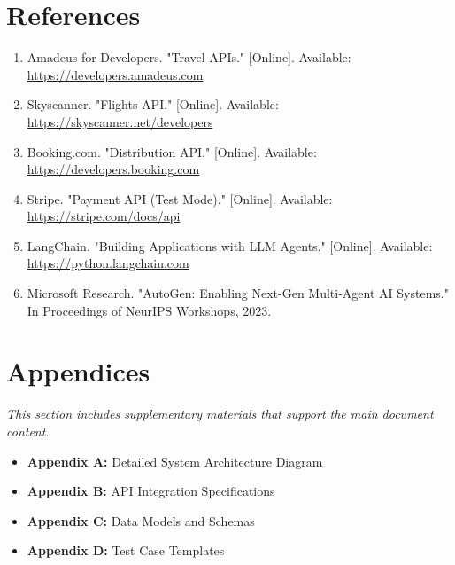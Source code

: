 \documentclass[12pt,a4paper]{article}
\begin{document}
\section{References}
\begin{enumerate}[leftmargin=*, itemsep=0.3em]
    \item Amadeus for Developers. "Travel APIs." [Online]. Available: \url{https://developers.amadeus.com}
    \item Skyscanner. "Flights API." [Online]. Available: \url{https://skyscanner.net/developers}
    \item Booking.com. "Distribution API." [Online]. Available: \url{https://developers.booking.com}
    \item Stripe. "Payment API (Test Mode)." [Online]. Available: \url{https://stripe.com/docs/api}
    \item LangChain. "Building Applications with LLM Agents." [Online]. Available: \url{https://python.langchain.com}
    \item Microsoft Research. "AutoGen: Enabling Next-Gen Multi-Agent AI Systems." In Proceedings of NeurIPS Workshops, 2023.
\end{enumerate}
\section{Appendices}
\noindent\textit{This section includes supplementary materials that support the main document content.}

\begin{itemize}[leftmargin=*, itemsep=0.3em]
    \item \textbf{Appendix A:} Detailed System Architecture Diagram
    \item \textbf{Appendix B:} API Integration Specifications
    \item \textbf{Appendix C:} Data Models and Schemas
    \item \textbf{Appendix D:} Test Case Templates
\end{itemize}
\end{document}
